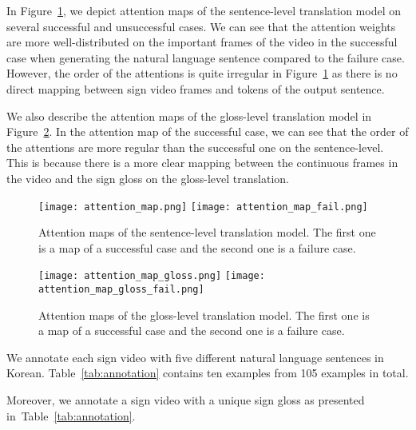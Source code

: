 \documentclass[10pt,twocolumn,letterpaper]{article}
\begin{document}
 In Figure~\ref{fig:attention}, we depict attention maps of the sentence-level translation model on several successful and unsuccessful cases. We can see that the attention weights are more well-distributed on the important frames of the video in the successful case when generating the natural language sentence compared to the failure case.  However, the order of the attentions is quite irregular in Figure~\ref{fig:attention} as there is no direct mapping between sign video frames and tokens of the output sentence.

We also describe the attention maps of the gloss-level translation model in Figure~\ref{fig:attention_gloss}. In the attention map of the successful case, we can see that the order of the attentions are more regular than the successful one on the sentence-level. This is because there is a more clear mapping between the continuous frames in the video and the sign gloss on the gloss-level translation.\\


\begin{figure}[ht]
\centering
\texttt{[image: attention\_map.png]}
\texttt{[image: attention\_map\_fail.png]}
\caption{Attention maps of the sentence-level translation model. The first one is a map of a successful case and the second one is a failure case.}
\label{fig:attention}
\end{figure}

\begin{figure}[ht]
\centering
\texttt{[image: attention\_map\_gloss.png]}
\texttt{[image: attention\_map\_gloss\_fail.png]}
\caption{Attention maps of the gloss-level translation model. The first one is a map of a successful case and the second one is a failure case.}
\label{fig:attention_gloss}
\end{figure}


 We annotate each sign video with five different natural language sentences in Korean. 
Table~\ref{tab:annotation} contains ten examples from 105 examples in total.

Moreover, we annotate a sign video with a unique sign gloss as presented in~Table~\ref{tab:annotation}.
\end{document}
